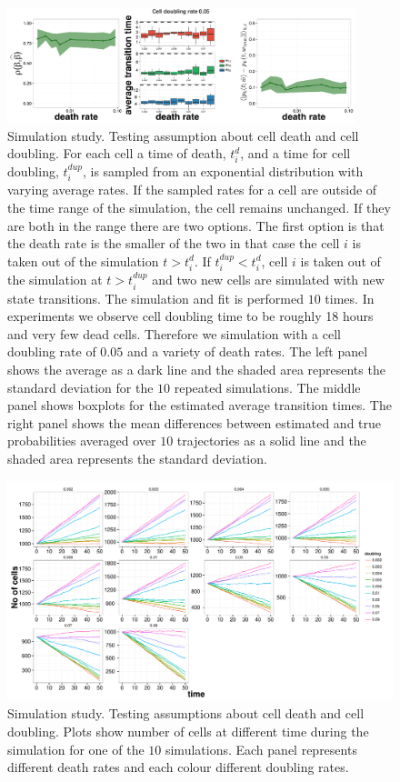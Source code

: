 \begin{figure}[b]
  \centering
  \includegraphics[width=0.9\textwidth]{pics/realist-dupl.pdf}
  \caption{Simulation study. Testing assumption about cell death and cell doubling. For each cell a time of death, $t_i^{d}$, and a time for cell doubling, $t_i^{dup}$, is sampled from an exponential distribution with varying average rates. If the sampled rates for a cell are outside of the time range of the simulation, the cell remains unchanged. If they are both in the range there are two options. The first option is that the death rate is the smaller of the two in that case the cell $i$ is taken out of the simulation $t>t_i^d$. If $t_i^{dup}<t_i^d$, cell $i$ is taken out of the simulation at $t > t_i^{dup}$ and two new cells are simulated with new state transitions. The simulation and fit is performed $10$ times.  In experiments we observe cell doubling time to be roughly 18 hours and very few dead cells. Therefore we simulation with a cell doubling rate of $0.05$ and a variety of death rates. The left panel shows the average as a dark line and the shaded area represents the standard deviation for the $10$ repeated simulations. The middle panel shows boxplots for the estimated average transition times. The right panel shows the mean differences between estimated and true probabilities averaged over $10$ trajectories as a solid line and the shaded area represents the standard deviation.}
  \label{fig:dupl-realistic}
\end{figure}


  \begin{figure}[h]
    \centering \includegraphics[width=1\textwidth]{pics/n-cell.pdf}
    \caption{Simulation study. Testing assumptions about cell death and cell doubling. Plots show number of cells at different time during the simulation for one of the $10$ simulations. Each panel represents different death rates and each colour different doubling rates.}
\label{fig:no-cells-dupl}
\end{figure}

